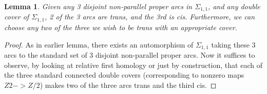 \documentclass[12pt]{amsart}
\newtheorem{lemma}[theorem]{Lemma}
\theoremstyle{definition}
\newcommand{\Si}{\Sigma}
\begin{document}
\begin{lemma}

Given any 3 disjoint non-parallel proper arcs in $\Si_{1,1}$, and any double
cover of $\Si_{1,1}$, 2 of the 3 arcs are trans, and the 3rd is cis.
Furthermore, we can choose any two of the three we wish to be trans with an
appropriate cover.

\end{lemma}
\begin{proof}

As in earlier lemma, there exists an automorphism of $\Si_{1,1}$ taking these
3 arcs to the standard set of 3 disjoint non-parallel proper arcs.  Now it
suffices to observe, by looking at relative first homology or just by
construction, that each of the three standard connected double covers
(corresponding to nonzero maps $Z2 -> Z/2$) makes two of the three arcs trans
and the third cis.

\end{proof}
\end{document}
